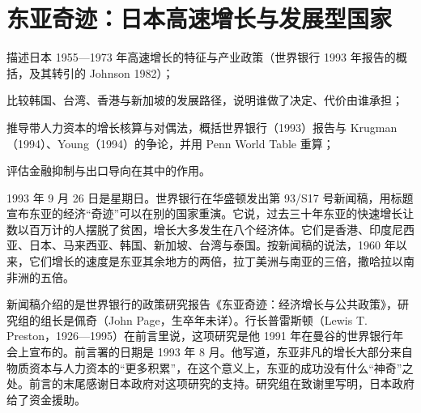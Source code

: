 \chapter{东亚奇迹：日本高速增长与发展型国家}\label{ch:eastasia}

\begin{chapterguide}
\begin{guidegoals}
\item 描述日本 1955—1973 年高速增长的特征与产业政策（世界银行 1993 年报告的概括，及其转引的 Johnson 1982）；
\item 比较韩国、台湾、香港与新加坡的发展路径，说明谁做了决定、代价由谁承担；
\item 推导带人力资本的增长核算与对偶法，概括世界银行（1993）报告与 Krugman（1994）、Young（1994）的争论，并用 Penn World Table 重算；
\item 评估金融抑制与出口导向在其中的作用。
\end{guidegoals}
\end{chapterguide}

1993 年 9 月 26 日是星期日。世界银行在华盛顿发出第 93/S17 号新闻稿，用标题宣布东亚的经济“奇迹”可以在别的国家重演\cite{worldbank1993news}。它说，过去三十年东亚的快速增长让数以百万计的人摆脱了贫困，增长大多发生在八个经济体\cite{worldbank1993news}。它们是香港、印度尼西亚、日本、马来西亚、韩国、新加坡、台湾与泰国。按新闻稿的说法，1960 年以来，它们增长的速度是东亚其余地方的两倍，拉丁美洲与南亚的三倍，撒哈拉以南非洲的五倍\cite{worldbank1993news}。

新闻稿介绍的是世界银行的政策研究报告《东亚奇迹：经济增长与公共政策》，研究组的组长是佩奇（John Page，生卒年未详）\cite{worldbank1993news,worldbank1993}。行长普雷斯顿（Lewis T. Preston，1926—1995）在前言里说，这项研究是他 1991 年在曼谷的世界银行年会上宣布的\cite{worldbank1993,worldbankpreston,loc42,gnd42}。前言署的日期是 1993 年 8 月。他写道，东亚非凡的增长大部分来自物质资本与人力资本的“更多积累”，在这个意义上，东亚的成功没有什么“神奇”之处\cite{worldbank1993}。前言的末尾感谢日本政府对这项研究的支持\cite{worldbank1993}。研究组在致谢里写明，日本政府给了资金援助\cite{worldbank1993}。


